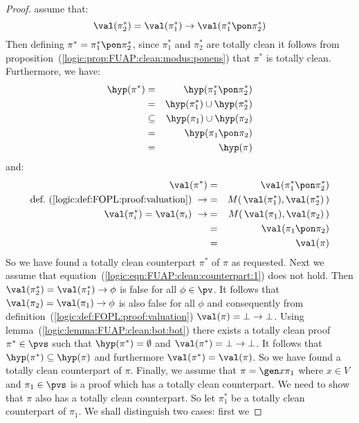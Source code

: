 \begin{proof}
assume that:
    \begin{equation}\label{logic:eqn:FUAP:clean:counterpart:1}
    \val(\pi_{2}^{*})=\val(\pi_{1}^{*})\to\val(\pi_{1}^{*}\pon\pi_{2}^{*})
    \end{equation}
Then defining $\pi^{*}=\pi_{1}^{*}\pon\pi_{2}^{*}$, since
$\pi_{1}^{*}$ and $\pi_{2}^{*}$ are totally clean it follows from
proposition~(\ref{logic:prop:FUAP:clean:modus:ponens}) that
$\pi^{*}$ is totally clean. Furthermore, we have:
    \begin{eqnarray*}
    \hyp(\pi^{*})&=&\hyp(\pi_{1}^{*}\pon\pi_{2}^{*})\\
    &=&\hyp(\pi_{1}^{*})\cup\hyp(\pi_{2}^{*})\\
    &\subseteq&
    \hyp(\pi_{1})\cup\hyp(\pi_{2})\\
    &=&\hyp(\pi_{1}\pon\pi_{2})\\
    &=&\hyp(\pi)
    \end{eqnarray*}
and:
    \begin{eqnarray*}
    \val(\pi^{*})&=&\val(\pi_{1}^{*}\pon\pi_{2}^{*})\\
    \mbox{def.~(\ref{logic:def:FOPL:proof:valuation})}\ \rightarrow
    &=&M(\,\val(\pi_{1}^{*}),\val(\pi_{2}^{*})\,)\\
    \val(\pi_{i}^{*})=\val(\pi_{i})\ \rightarrow
    &=&M(\,\val(\pi_{1}),\val(\pi_{2})\,)\\
    &=&\val(\pi_{1}\pon\pi_{2})\\
    &=&\val(\pi)
    \end{eqnarray*}
So we have found a totally clean counterpart $\pi^{*}$ of $\pi$ as
requested. Next we assume that
equation~(\ref{logic:eqn:FUAP:clean:counterpart:1}) does not hold.
Then $\val(\pi_{2}^{*})=\val(\pi_{1}^{*})\to\phi$ is false for all
$\phi\in\pv$. It follows that $\val(\pi_{2})=\val(\pi_{1})\to\phi$
is also false for all $\phi$ and consequently from
definition~(\ref{logic:def:FOPL:proof:valuation})
$\val(\pi)=\bot\to\bot$. Using
lemma~(\ref{logic:lemma:FUAP:clean:bot:bot}) there exists a totally
clean proof $\pi^{*}\in\pvs$ such that $\hyp(\pi^{*})=\emptyset$ and
$\val(\pi^{*})=\bot\to\bot$. It follows that
$\hyp(\pi^{*})\subseteq\hyp(\pi)$ and furthermore
$\val(\pi^{*})=\val(\pi)$. So we have found a totally clean
counterpart of $\pi$. Finally, we assume that $\pi=\gen x\pi_{1}$
where $x\in V$ and $\pi_{1}\in\pvs$ is a proof which has a totally
clean counterpart. We need to show that $\pi$ also has a totally
clean counterpart. So let $\pi_{1}^{*}$ be a totally clean
counterpart of $\pi_{1}$. We shall distinguish two cases: first we

\end{proof}

